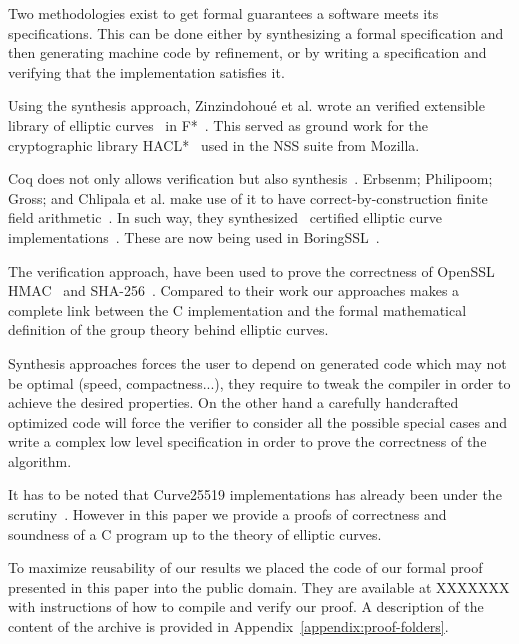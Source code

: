 Two methodologies exist to get formal guarantees a software meets its specifications.
This can be done either by synthesizing a formal specification and then generating
machine code by refinement, or by writing a specification and verifying that the
implementation satisfies it.

Using the synthesis approach, Zinzindohou{\'{e}} et al. wrote an verified extensible
library of elliptic curves~\cite{Zinzindohoue2016AVE} in F*~\cite{DBLP:journals/corr/BhargavanDFHPRR17}.
This served as ground work for the cryptographic library HACL*~\cite{zinzindohoue2017hacl}
used in the NSS suite from Mozilla.

Coq does not only allows verification but also synthesis~\cite{CpdtJFR}.
Erbsenm; Philipoom; Gross; and Chlipala et al. make use of it to have
correct-by-construction finite field arithmetic~\cite{Philipoom2018CorrectbyconstructionFF}.
In such way, they synthesized~\cite{Erbsen2016SystematicSO} certified elliptic curve
implementations~\cite{Erbsen2017CraftingCE}. These are now being used in
BoringSSL~\cite{fiat-crypto}.

The verification approach, have been used to prove the correctness of OpenSSL
HMAC~\cite{Beringer2015VerifiedCA} and SHA-256~\cite{2015-Appel}. Compared to
their work our approaches makes a complete link between the C implementation and
the formal mathematical definition of the group theory behind elliptic curves.

Synthesis approaches forces the user to depend on generated code which may not
be optimal (speed, compactness...), they require to tweak the compiler in order
to achieve the desired properties. On the other hand a carefully handcrafted
optimized code will force the verifier to consider all the possible special cases
and write a complex low level specification in order to prove the correctness of
the algorithm.

It has to be noted that Curve25519 implementations has already been under the scrutiny~\cite{Chen2014VerifyingCS}.
However in this paper we provide a proofs of correctness and soundness of a C program up to
the theory of elliptic curves.

To maximize reusability of our results we placed the code of our formal proof
presented in this paper into the public domain. They are available at XXXXXXX
with instructions of how to compile and verify our proof.
A description of the content of the archive is provided in
Appendix~\ref{appendix:proof-folders}.

